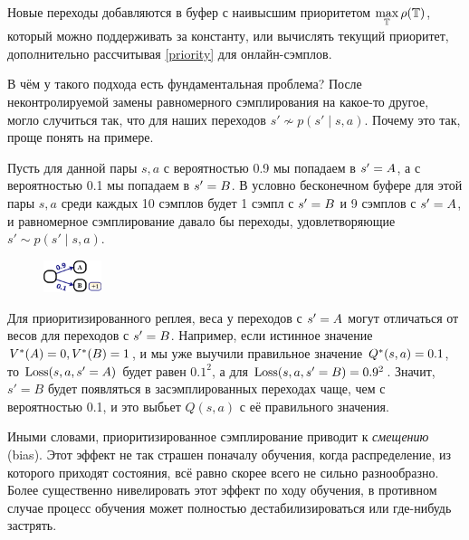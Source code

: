 \begin{remark}
Новые переходы добавляются в буфер с наивысшим приоритетом $\max\limits_{\mathbb{T} } \rho(\mathbb{T} )$, который можно поддерживать за константу, или вычислять текущий приоритет, дополнительно рассчитывая \eqref{priority} для онлайн-сэмплов.
\end{remark}

В чём у такого подхода есть фундаментальная проблема? После неконтролируемой замены равномерного сэмплирования на какое-то другое, могло случиться так, что для наших переходов $s' \not\sim p(s' \mid s, a)$. Почему это так, проще понять на примере.

\begin{example}
Пусть для данной пары $s, a$ с вероятностью 0.9 мы попадаем в $s' \HM= A$, а с вероятностью 0.1 мы попадаем в $s' \HM= B$. В условно бесконечном буфере для этой пары $s, a$ среди каждых 10 сэмплов будет 1 сэмпл с $s' \HM= B$ и 9 сэмплов с $s' \HM= A$, и равномерное сэмплирование давало бы переходы, удовлетворяющие $s' \sim p(s' \mid s, a)$. 

\begin{figure}
\vspace{-0.3cm}
\centering
\includegraphics[width=0.15\textwidth]{Images/PrioritizedIssue.png}
\end{figure}

Для приоритизированного реплея, веса у переходов с $s' \HM= A$ могут отличаться от весов для переходов с $s' \HM= B$. Например, если истинное значение $V^*(A) \HM= 0, V^*(B) \HM= 1$, и мы уже выучили правильное значение $Q^*(s, a) \HM= 0.1$, то $\operatorname{Loss}(s, a, s'=A)$ будет равен $0.1^2$, а для $\operatorname{Loss}(s, a, s'=B) = 0.9^2$. Значит, $s' = B$ будет появляться в засэмплированных переходах чаще, чем с вероятностью 0.1, и это выбьет $Q(s, a)$ с её правильного значения.
\end{example}

Иными словами, приоритизированное сэмплирование приводит к \emph{смещению} (bias). Этот эффект не так страшен поначалу обучения, когда распределение, из которого приходят состояния, всё равно скорее всего не сильно разнообразно. Более существенно нивелировать этот эффект по ходу обучения, в противном случае процесс обучения может полностью дестабилизироваться или где-нибудь застрять.


